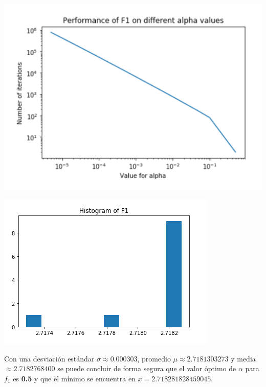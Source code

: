 \documentclass[10pt,letterpaper]{article}
\begin{document}
\begin{enumerate}
\begin{enumerate}
                    \begin{multicols}{2}
                        \begin{center}
                            \includegraphics[scale=.4]{assets/theory/1-b/f1-performance.png}
                        \end{center}
                        \begin{center}
                            \includegraphics[scale=.5]{assets/theory/1-b/f1-dist.png}
                        \end{center}
                    \end{multicols}

                    Con una desviación estándar $\sigma \approx 0.000303$,
                    promedio $\mu \approx 2.7181303273$ y media $\approx 2.7182768400$
                    se puede concluir de forma segura que el valor óptimo de $\alpha$ para
                    $f_1$ es \textbf{0.5} y que el mínimo se encuentra en
                    $x=2.718281828459045$.


\end{enumerate}
\end{enumerate}
\end{document}
